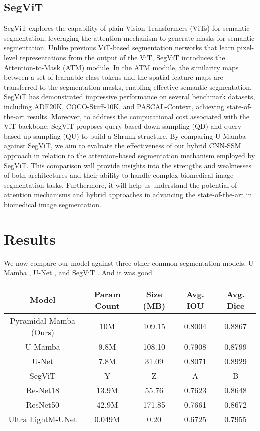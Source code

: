 \documentclass[conference]{IEEEtran}
\begin{document}
\subsection{SegViT}
SegViT \cite{zhang2022segvit} explores the capability of plain Vision Transformers (ViTs) \cite{dosovitskiy2021image} for semantic segmentation, leveraging the attention mechanism to generate masks for semantic segmentation. Unlike previous ViT-based segmentation networks that learn pixel-level representations from the output of the ViT, SegViT introduces the Attention-to-Mask (ATM) module. In the ATM module, the similarity maps between a set of learnable class tokens and the spatial feature maps are transferred to the segmentation masks, enabling effective semantic segmentation.
SegViT has demonstrated impressive performance on several benchmark datasets, including ADE20K, COCO-Stuff-10K, and PASCAL-Context, achieving state-of-the-art results. Moreover, to address the computational cost associated with the ViT backbone, SegViT proposes query-based down-sampling (QD) and query-based up-sampling (QU) to build a Shrunk structure. By comparing U-Mamba against SegViT, we aim to evaluate the effectiveness of our hybrid CNN-SSM approach in relation to the attention-based segmentation mechanism employed by SegViT. This comparison will provide insights into the strengths and weaknesses of both architectures and their ability to handle complex biomedical image segmentation tasks. Furthermore, it will help us understand the potential of attention mechanisms and hybrid approaches in advancing the state-of-the-art in biomedical image segmentation.

\section{Results}
We now compare our model against three other common segmentation models, U-Mamba \cite{}, U-Net \cite{}, and SegViT \cite{}. And it was good.

\centering
\begin{tabular}{|c|c|c|c|c|}
\hline
Model & Param Count & Size (MB) & Avg. IOU & Avg. Dice \\
\hline
Pyramidal Mamba (Ours) & 10M & 109.15 & 0.8004 & 0.8867 \\
\hline
U-Mamba & 9.8M & 108.10 & 0.7908 & 0.8799 \\
\hline
U-Net & 7.8M & 31.09 & 0.8071 & 0.8929 \\
\hline
SegViT & Y & Z & A & B \\
\hline
ResNet18 & 13.9M & 55.76 & 0.7623 & 0.8648 \\
\hline
ResNet50 & 42.9M & 171.85 & 0.7661 & 0.8672 \\
\hline
Ultra LightM-UNet & 0.049M & 0.20 & 0.6725 & 0.7955 \\
\hline
\end{tabular}
\end{document}
